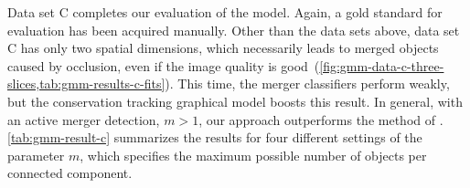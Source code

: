Data set C completes our evaluation of the model. Again, a gold standard for evaluation has been
acquired manually. Other than the data sets above, data set C has only two spatial dimensions, which
necessarily leads to merged objects caused by occlusion, even if the image quality is
good~(\cref{fig:gmm-data-c-three-slices,tab:gmm-results-c-fits}). This time, the merger classifiers
perform weakly, but the conservation tracking graphical model boosts this result. In general, with
an active merger detection, \ie $m>1$, our approach outperforms the method of
\citet{kausler_12_discrete}. \cref{tab:gmm-result-c} summarizes the results for four different
settings of the parameter $m$, which specifies the maximum possible number of objects per connected
component.

